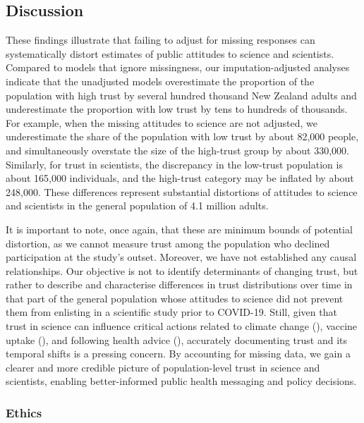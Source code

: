 \documentclass[
  single column]{article}
\begin{document}
\subsection{Discussion}\label{discussion}

These findings illustrate that failing to adjust for missing responses
can systematically distort estimates of public attitudes to science and
scientists. Compared to models that ignore missingness, our
imputation-adjusted analyses indicate that the unadjusted models
overestimate the proportion of the population with high trust by several
hundred thousand New Zealand adults and underestimate the proportion
with low trust by tens to hundreds of thousands. For example, when the
missing attitudes to science are not adjusted, we underestimate the
share of the population with low trust by about 82,000 people, and
simultaneously overstate the size of the high-trust group by about
330,000. Similarly, for trust in scientists, the discrepancy in the
low-trust population is about 165,000 individuals, and the high-trust
category may be inflated by about 248,000. These differences represent
substantial distortions of attitudes to science and scientists in the
general population of 4.1 million adults.

It is important to note, once again, that these are minimum bounds of
potential distortion, as we cannot measure trust among the population
who declined participation at the study's outset. Moreover, we have not
established any causal relationships. Our objective is not to identify
determinants of changing trust, but rather to describe and characterise
differences in trust distributions over time in that part of the general
population whose attitudes to science did not prevent them from
enlisting in a scientific study prior to COVID-19. Still, given that
trust in science can influence critical actions related to climate
change (),
vaccine uptake (), and following health advice
(),
accurately documenting trust and its temporal shifts is a pressing
concern. By accounting for missing data, we gain a clearer and more
credible picture of population-level trust in science and scientists,
enabling better-informed public health messaging and policy decisions.

\newpage{}

\subsubsection{Ethics}\label{ethics}
\end{document}
